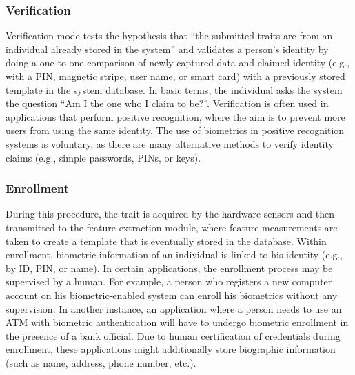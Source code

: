\subsubsection{Verification}
Verification mode tests the hypothesis that ``the submitted traits are from an individual already stored in the system'' and validates a person's identity by doing a one-to-one comparison of newly captured data and claimed identity (e.g., with a PIN, magnetic stripe, user name, or smart card) with a previously stored template in the system database. In basic terms, the individual asks the system the question ``Am I the one who I claim to be?''\cite{BiometricAuthentication}. Verification is often used in applications that perform positive recognition, where the aim is to prevent more users from using the same identity. The use of biometrics in positive recognition systems is voluntary, as there are many alternative methods to verify identity claims (e.g., simple passwords, PINs, or keys)\cite{HandbookOfBiometrics}.

\subsubsection{Enrollment}
During this procedure, the trait is acquired by the hardware sensors and then transmitted to the feature extraction module, where feature measurements are taken to create a template that is eventually stored in the database. Within enrollment, biometric information of an individual is linked to his identity (e.g., by ID, PIN, or name). In certain applications, the enrollment process may be supervised by a human. For example, a person who registers a new computer account on his biometric-enabled system can enroll his biometrics without any supervision. In another instance, an application where a person needs to use an ATM with biometric authentication will have to undergo biometric enrollment in the presence of a bank official\cite{HandbookOfBiometrics}. Due to human certification of credentials during enrollment, these applications might additionally store biographic information (such as name, address, phone number, etc.). 


